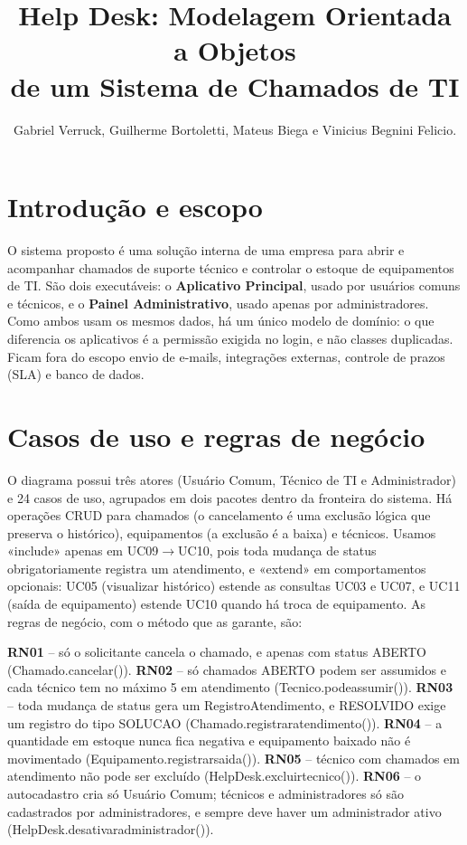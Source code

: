 \documentclass[12pt]{article}
\title{Help Desk: Modelagem Orientada a Objetos\\de um Sistema de Chamados de TI}
\author{Gabriel Verruck, Guilherme Bortoletti, Mateus Biega e Vinicius Begnini Felicio.}
\newcommand{\brk}{\textunderscore\allowbreak}
\newcommand{\cod}[1]{{\small\ttfamily\let\_\brk #1}}
\begin{document}
\maketitle

\section{Introdução e escopo}

O sistema proposto é uma solução interna de uma empresa para abrir e acompanhar chamados de suporte técnico e controlar o estoque de equipamentos de TI. São dois executáveis: o \textbf{Aplicativo Principal}, usado por usuários comuns e técnicos, e o \textbf{Painel Administrativo}, usado apenas por administradores. Como ambos usam os mesmos dados, há um único modelo de domínio: o que diferencia os aplicativos é a permissão exigida no login, e não classes duplicadas. Ficam fora do escopo envio de e-mails, integrações externas, controle de prazos (SLA) e banco de dados.

\section{Casos de uso e regras de negócio}

O diagrama possui três atores (Usuário Comum, Técnico de TI e Administrador) e 24 casos de uso, agrupados em dois pacotes dentro da fronteira do sistema. Há operações CRUD para chamados (o cancelamento é uma exclusão lógica que preserva o histórico), equipamentos (a exclusão é a baixa) e técnicos. Usamos \cod{«include»} apenas em UC09$\rightarrow$UC10, pois toda mudança de status obrigatoriamente registra um atendimento, e \cod{«extend»} em comportamentos opcionais: UC05 (visualizar histórico) estende as consultas UC03 e UC07, e UC11 (saída de equipamento) estende UC10 quando há troca de equipamento. As regras de negócio, com o método que as garante, são:

\noindent\textbf{RN01} -- só o solicitante cancela o chamado, e apenas com status ABERTO (\cod{Chamado.cancelar()}).
\textbf{RN02} -- só chamados ABERTO podem ser assumidos e cada técnico tem no máximo 5 em atendimento (\cod{Tecnico.pode\_assumir()}).
\textbf{RN03} -- toda mudança de status gera um \cod{RegistroAtendimento}, e RESOLVIDO exige um registro do tipo SOLUCAO (\cod{Chamado.registrar\_atendimento()}).
\textbf{RN04} -- a quantidade em estoque nunca fica negativa e equipamento baixado não é movimentado (\cod{Equipamento.registrar\_saida()}).
\textbf{RN05} -- técnico com chamados em atendimento não pode ser excluído (\cod{HelpDesk.excluir\_tecnico()}).
\textbf{RN06} -- o autocadastro cria só Usuário Comum; técnicos e administradores só são cadastrados por administradores, e sempre deve haver um administrador ativo (\cod{HelpDesk.desativar\_administrador()}).
\end{document}
